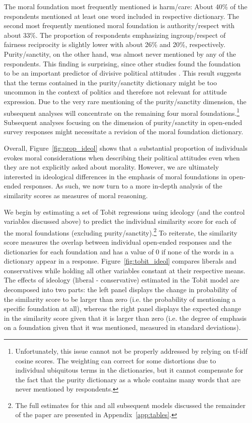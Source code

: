 \documentclass[12pt]{article}
\begin{document}
The moral foundation most frequently mentioned is harm/care: About 40\% of the respondents mentioned at least one word included in respective dictionary. The second most frequently mentioned moral foundation is authority/respect with about 33\%. The proportion of respondents emphasizing ingroup/respect of fairness reciprocity is slightly lower with about 26\% and 20\%, respectively. Purity/sanctity, on the other hand, was almost never mentioned by any of the respondents. This finding is surprising, since other studies found the foundation to be an important predictor of divisive political attitudes \citep{koleva2012tracing}. This result suggests that the terms contained in the purity/sanctity dictionary might be too uncommon in the context of politics and therefore not relevant for attitude expression. Due to the very rare mentioning of the purity/sanctity dimension, the subsequent analyses will concentrate on the remaining four moral foundations.\footnote{Unfortunately, this issue cannot not be properly addressed by relying on tf-idf cosine scores. The weighting can correct for some distortions due to individual ubiquitous terms in the dictionaries, but it cannot compensate for the fact that the purity dictionary as a whole contains many words that are never mentioned by respondents.} Subsequent analyses focusing on the dimension of purity/sanctity in open-ended survey responses might necessitate a revision of the moral foundation dictionary.

Overall, Figure~\ref{fig:prop_ideol} shows that a substantial proportion of individuals evokes moral considerations when describing their political attitudes even when they are not explicitly asked about morality. However, we are ultimately interested in ideological differences in the emphasis of moral foundations in open-ended responses. As such, we now turn to a more in-depth analysis of the similarity scores as measures of moral reasoning.

We begin by estimating a set of Tobit regressions using ideology (and the control variables discussed above) to predict the individual similarity score for each of the moral foundations (excluding purity/sanctity).\footnote{The full estimates for this and all subsequent models discussed the remainder of the paper are presented in Appendix~\ref{app:tables}.} To reiterate, the similarity score measures the overlap between individual open-ended responses and the dictionaries for each foundation and has a value of 0 if none of the words in a dictionary appear in a response. Figure~\ref{fig:tobit_ideol} compares liberals and conservatives while holding all other variables constant at their respective means. The effects of ideology (liberal - conservative) estimated in the Tobit model are decomposed into two parts: the left panel displays the change in probability of the similarity score to be larger than zero (i.e. the probability of mentioning a specific foundation at all), whereas the right panel displays the expected change in the similarity score given that it is larger than zero (i.e. the degree of emphasis on a foundation given that it was mentioned, measured in standard deviations).
\end{document}
